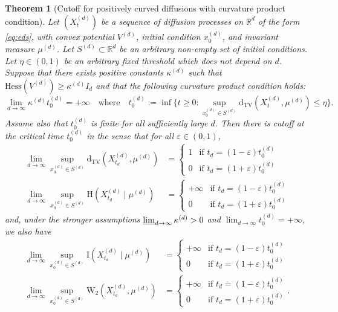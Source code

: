 \documentclass[10pt,reqno]{amsart}
\newtheorem{theorem}{Theorem}[section]
\numberwithin{equation}{section}
\newcommand{\DTV}{\mathrm{d}_{\mathrm{TV}}}
\begin{document}
\begin{theorem}[Cutoff for positively curved diffusions with curvature product condition]\label{th:prodcondcut}
  Let $(X_t^{(d)})$ be a sequence of diffusion processes on $\mathbb{R}^d$ of
  the form \eqref{eq:eds}, with convex potential $V^{(d)}$, initial condition
  $x_0^{(d)}$, and invariant measure $\mu^{(d)}$. Let
  $S^{(d)}\subset\mathbb{R}^d$ be an arbitrary non-empty set of initial
  conditions. Let $\eta\in(0,1)$ be an arbitrary fixed threshold which does
  not depend on $d$. Suppose that there exists positive constants
  $\kappa^{(d)}$ such that $\mathrm{Hess}(V^{(d)})\geq\kappa^{(d)}I_d$ and
  that the following curvature product condition holds:
  \[
    \lim_{d\to\infty}\kappa^{(d)}t_0^{(d)}=+\infty
    \quad\text{where}\quad
    t_0^{(d)} := \inf\bigl\{t \geq 0:\sup_{x_0^{(d)} \in S^{(d)}} \DTV(X_t^{(d)}, \mu^{(d)}) \leq\eta\bigr\}.
  \]
  Assume also that $t_0^{(d)}$ is finite for all sufficiently large $d$.
  Then there is cutoff at the critical time $t_0^{(d)}$ in the sense that for all $\varepsilon\in(0,1)$, 
  \begin{align}
    \lim_{d\to\infty}
    \sup_{x^{(d)}_0\in S^{(d)}}
    \DTV(X^{(d)}_{t_d},\mu^{(d)})
    &=
      \begin{cases}
        1 & \text{if $t_d=(1-\varepsilon)t_0^{(d)}$}\\
        0 & \text{if $t_d=(1+\varepsilon)t_0^{(d)}$}
      \end{cases}\\     
    \lim_{d\to\infty}
    \sup_{x^{(d)}_0\in S^{(d)}}
    \mathrm{H}(X^{(d)}_{t_d}\mid\mu^{(d)})
    &=
      \begin{cases}
        +\infty & \text{if $t_d=(1-\varepsilon)t_0^{(d)}$}\\
        0 & \text{if $t_d=(1+\varepsilon)t_0^{(d)}$}
      \end{cases}
  \end{align}
  and, under the stronger assumptions $\varliminf_{d\to\infty}\kappa^{(d)}>0$ and $\lim_{d\to\infty}t_0^{(d)}=+\infty$, we also have
  \begin{align}
    \lim_{d\to\infty} \sup_{x^{(d)}_0\in S^{(d)}} \mathrm{I}(X^{(d)}_{t_d}\mid\mu^{(d)})
    &=
      \begin{cases}
        +\infty & \text{if $t_d=(1-\varepsilon)t_0^{(d)}$}\\
        0 & \text{if $t_d=(1+\varepsilon)t_0^{(d)}$}
      \end{cases}\\
    \lim_{d\to\infty}
    \sup_{x^{(d)}_0\in S^{(d)}}
    \mathrm{W}_2(X^{(d)}_{t_d},\mu^{(d)})
    &=
      \begin{cases}
        +\infty & \text{if $t_d=(1-\varepsilon)t_0^{(d)}$}\\
        0 & \text{if $t_d=(1+\varepsilon)t_0^{(d)}$}
      \end{cases}.
  \end{align}
\end{theorem}
\end{document}
